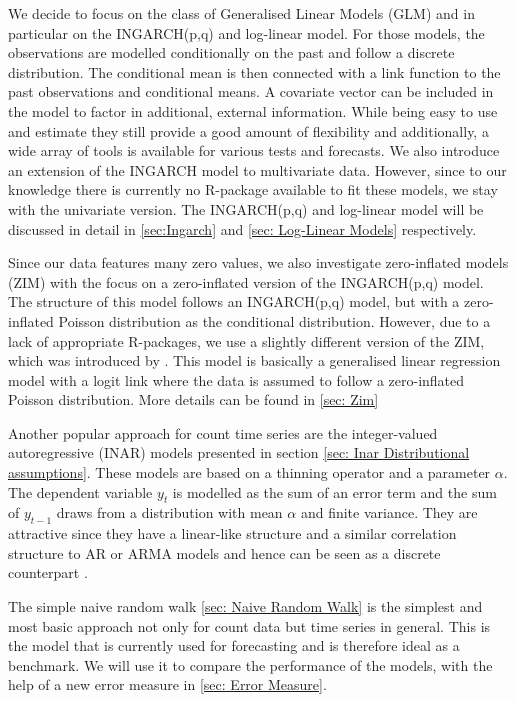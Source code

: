 We decide to focus on the class of Generalised Linear Models (GLM) and in particular on the INGARCH(p,q) and log-linear model. For those models, the observations are modelled conditionally on the past and follow a discrete distribution. The conditional mean is then connected with a link function to the past observations and conditional means. A covariate vector can be included in the model to factor in additional, external information. While being easy to use and estimate they still provide a good amount of flexibility and additionally, a wide array of tools is available for various tests and forecasts. We also introduce an extension of the INGARCH model to multivariate data. However, since to our knowledge there is currently no R-package available to fit these models, we stay with the univariate version. The INGARCH(p,q) and log-linear model will be discussed in detail in \ref{sec:Ingarch} and \ref{sec: Log-Linear Models} respectively.

Since our data features many zero values, we also investigate zero-inflated models (ZIM) with the focus on a zero-inflated version of the INGARCH(p,q) model. The structure of this model follows an INGARCH(p,q) model, but with a zero-inflated Poisson distribution as the conditional distribution. However, due to a lack of appropriate R-packages, we use a slightly different version of the ZIM, which was introduced by \cite{Lambert:1992}. This model is basically a generalised linear regression model with a logit link where the data is assumed to follow a zero-inflated Poisson distribution. More details can be found in \ref{sec: Zim}

Another popular approach for count time series are the integer-valued autoregressive (INAR) models presented in section \ref{sec: Inar Distributional assumptions}. These models are based on a thinning operator and a parameter $\alpha$. The dependent variable $y_t$ is modelled as the sum of an error term and the sum of $y_{t-1}$ draws from a distribution with mean $\alpha$ and finite variance. They are attractive since they have a linear-like structure and a similar correlation structure to AR or ARMA models and hence can be seen as a discrete counterpart \cite{Heinen:2003}. 

The simple naive random walk \ref{sec: Naive Random Walk} is the simplest and most basic approach not only for count data but time series in general. This is the model that is currently used for forecasting and is therefore ideal as a benchmark. We will use it to compare the performance of the models, with the help of a new error measure in \ref{sec: Error Measure}. 

